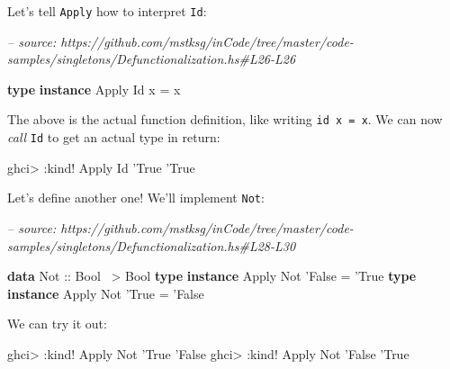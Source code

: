 \documentclass[]{article}
\newenvironment{Shaded}{}{}
\newcommand{\CommentTok}[1]{\textcolor[rgb]{0.38,0.63,0.69}{\textit{#1}}}
\newcommand{\DataTypeTok}[1]{\textcolor[rgb]{0.56,0.13,0.00}{#1}}
\newcommand{\FunctionTok}[1]{\textcolor[rgb]{0.02,0.16,0.49}{#1}}
\newcommand{\KeywordTok}[1]{\textcolor[rgb]{0.00,0.44,0.13}{\textbf{#1}}}
\newcommand{\NormalTok}[1]{#1}
\newcommand{\OtherTok}[1]{\textcolor[rgb]{0.00,0.44,0.13}{#1}}
\begin{document}
Let's tell \texttt{Apply} how to interpret \texttt{Id}:

\begin{Shaded}
\begin{Highlighting}[]
\CommentTok{-- source: https://github.com/mstksg/inCode/tree/master/code-samples/singletons/Defunctionalization.hs#L26-L26}

\KeywordTok{type} \KeywordTok{instance} \DataTypeTok{Apply} \DataTypeTok{Id}\NormalTok{ x }\FunctionTok{=}\NormalTok{ x}
\end{Highlighting}
\end{Shaded}

The above is the actual function definition, like writing \texttt{id\ x\ =\ x}.
We can now \emph{call} \texttt{Id} to get an actual type in return:

\begin{Shaded}
\begin{Highlighting}[]
\NormalTok{ghci}\FunctionTok{>} \FunctionTok{:}\NormalTok{kind}\FunctionTok{!} \DataTypeTok{Apply} \DataTypeTok{Id}\NormalTok{ '}\DataTypeTok{True}
\NormalTok{'}\DataTypeTok{True}
\end{Highlighting}
\end{Shaded}

Let's define another one! We'll implement \texttt{Not}:

\begin{Shaded}
\begin{Highlighting}[]
\CommentTok{-- source: https://github.com/mstksg/inCode/tree/master/code-samples/singletons/Defunctionalization.hs#L28-L30}

\KeywordTok{data} \DataTypeTok{Not}\OtherTok{ ::} \DataTypeTok{Bool} \FunctionTok{~>} \DataTypeTok{Bool}
\KeywordTok{type} \KeywordTok{instance} \DataTypeTok{Apply} \DataTypeTok{Not}\NormalTok{ '}\DataTypeTok{False} \FunctionTok{=}\NormalTok{ '}\DataTypeTok{True}
\KeywordTok{type} \KeywordTok{instance} \DataTypeTok{Apply} \DataTypeTok{Not}\NormalTok{ '}\DataTypeTok{True}  \FunctionTok{=}\NormalTok{ '}\DataTypeTok{False}
\end{Highlighting}
\end{Shaded}

We can try it out:

\begin{Shaded}
\begin{Highlighting}[]
\NormalTok{ghci}\FunctionTok{>} \FunctionTok{:}\NormalTok{kind}\FunctionTok{!} \DataTypeTok{Apply} \DataTypeTok{Not}\NormalTok{ '}\DataTypeTok{True}
\NormalTok{'}\DataTypeTok{False}
\NormalTok{ghci}\FunctionTok{>} \FunctionTok{:}\NormalTok{kind}\FunctionTok{!} \DataTypeTok{Apply} \DataTypeTok{Not}\NormalTok{ '}\DataTypeTok{False}
\NormalTok{'}\DataTypeTok{True}
\end{Highlighting}
\end{Shaded}
\end{document}
